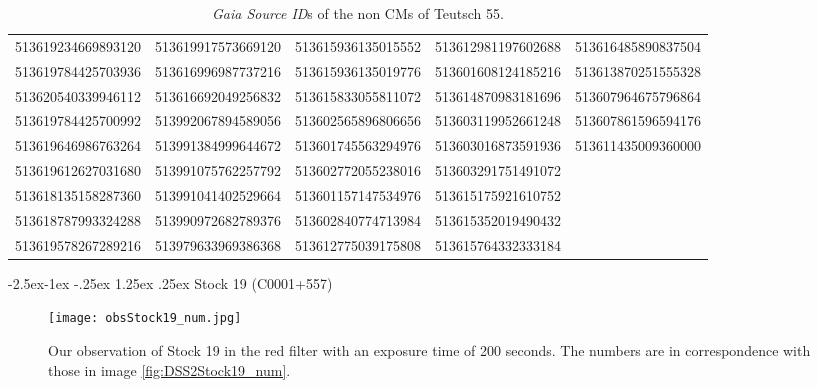 \documentclass{article}
\makeatletter
\renewcommand\paragraph{\@startsection{paragraph}{4}{\z@}%
            {-2.5ex\@plus -1ex \@minus -.25ex}%
            {1.25ex \@plus .25ex}%
            {\normalfont\normalsize\bfseries}}
\makeatother
\begin{document}
\begin{table}[H]
\centering
\caption{\textit{Gaia Source ID}s of the non CMs of Teutsch 55.}
\begin{tabular}{lllll}
513619234669893120 & 513619917573669120 & 513615936135015552 & 513612981197602688 & 513616485890837504 \\
513619784425703936 & 513616996987737216 & 513615936135019776 & 513601608124185216 & 513613870251555328 \\
513620540339946112 & 513616692049256832 & 513615833055811072 & 513614870983181696 & 513607964675796864 \\
513619784425700992 & 513992067894589056 & 513602565896806656 & 513603119952661248 & 513607861596594176 \\
513619646986763264 & 513991384999644672 & 513601745563294976 & 513603016873591936 & 513611435009360000 \\
513619612627031680 & 513991075762257792 & 513602772055238016 & 513603291751491072 &                    \\
513618135158287360 & 513991041402529664 & 513601157147534976 & 513615175921610752 &                    \\
513618787993324288 & 513990972682789376 & 513602840774713984 & 513615352019490432 &                    \\
513619578267289216 & 513979633969386368 & 513612775039175808 & 513615764332333184 &                   
\end{tabular}
\end{table}




\paragraph{Stock 19 (C0001+557)}

\begin{figure}[H]
  \centering
    \texttt{[image: obsStock19\_num.jpg]}
  \caption{Our observation of Stock 19 in the red filter with an exposure time of 200 seconds. The numbers are in correspondence with those in image \ref{fig:DSS2Stock19_num}.}
  \label{fig:obsStock19_num}
\end{figure}
\end{document}
